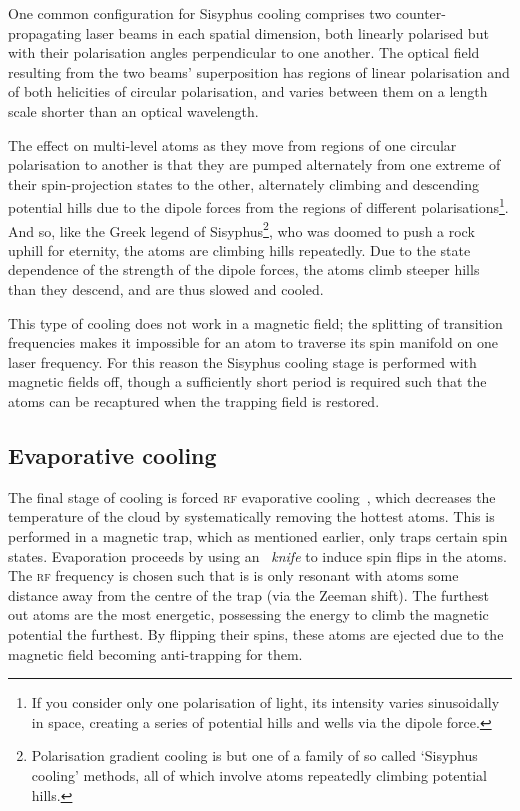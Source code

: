 One common configuration for Sisyphus cooling comprises two counter-propagating laser beams in each spatial dimension, both linearly polarised but with their polarisation angles perpendicular to one another. The optical field resulting from the two beams' superposition has regions of linear polarisation and of both helicities of circular polarisation, and varies between them on a length scale shorter than an optical wavelength.

The effect on multi-level atoms as they move from regions of one circular polarisation to another is that they are pumped alternately from one extreme of their spin-projection states to the other, alternately climbing and descending potential hills due to the dipole forces from the regions of different polarisations\footnote{If you consider only one polarisation of light, its intensity varies sinusoidally in space, creating a series of potential hills and wells via the dipole force.}. And so, like the Greek legend of Sisyphus\footnote{Polarisation gradient cooling is but one of a family of so called `Sisyphus cooling' methods, all of which involve atoms repeatedly climbing potential hills.}, who was doomed to push a rock uphill for eternity, the atoms are climbing hills repeatedly. Due to the state dependence of the strength of the dipole forces, the atoms climb steeper hills than they descend, and are thus slowed and cooled.

This type of cooling does not work in a magnetic field; the splitting of transition frequencies makes it impossible for an atom to traverse its spin manifold on one laser frequency. For this reason the Sisyphus cooling stage is performed with magnetic fields off, though a sufficiently short period is required such that the atoms can be recaptured when the trapping field is restored.

\subsection{Evaporative cooling}\label{sec:evaporative_cooling}

The final stage of cooling is forced \textsc{rf} evaporative cooling~\cite{hess_evaporative_1986, anderson_observation_1995}, which decreases the temperature of the cloud by systematically removing the hottest atoms. This is performed in a magnetic trap, which as mentioned earlier, only traps certain spin states. Evaporation proceeds by using an \emph{\rf\ knife} to induce spin flips in the atoms. The \textsc{rf} frequency is chosen such that is is only resonant with atoms some distance away from the centre of the trap (via the Zeeman shift). The furthest out atoms are the most energetic, possessing the energy to climb the magnetic potential the furthest. By flipping their spins, these atoms are ejected due to the magnetic field becoming anti-trapping for them.

